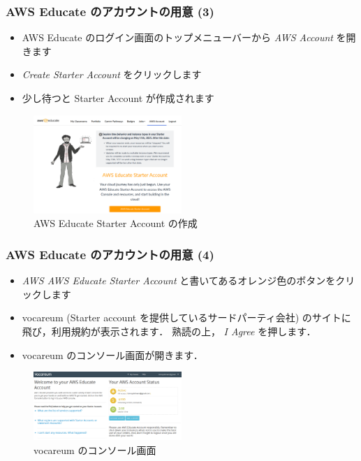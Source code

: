 \documentclass[unicode,11pt]{beamer}
\begin{document}
\begin{frame}
\frametitle{AWS Educate のアカウントの用意 (3)}

\begin{itemize}
    \item AWS Educate のログイン画面のトップメニューバーから \emph{AWS Account} を開きます
    \item \emph{Create Starter Account} をクリックします
    \item 少し待つと Starter Account が作成されます
\end{itemize}

\begin{figure}
    \centering
    \includegraphics[width=0.5\textwidth]{imgs/aws_educate_screenshot2.png}
    \caption{AWS Educate Starter Account の作成}
\end{figure}

\end{frame}

\begin{frame}
\frametitle{AWS Educate のアカウントの用意 (4)}

\begin{itemize}
    \item \emph{AWS AWS Educate Starter Account} と書いてあるオレンジ色のボタンをクリックします
    \item vocareum (Starter account を提供しているサードパーティ会社) のサイトに飛び，利用規約が表示されます．
    熟読の上， \emph{I Agree} を押します．
    \item vocareum のコンソール画面が開きます．
\end{itemize}

\begin{figure}
    \centering
    \includegraphics[width=0.5\textwidth]{imgs/vocareum_screenshot.png}
    \caption{vocareum のコンソール画面}
\end{figure}

\end{frame}
\end{document}
